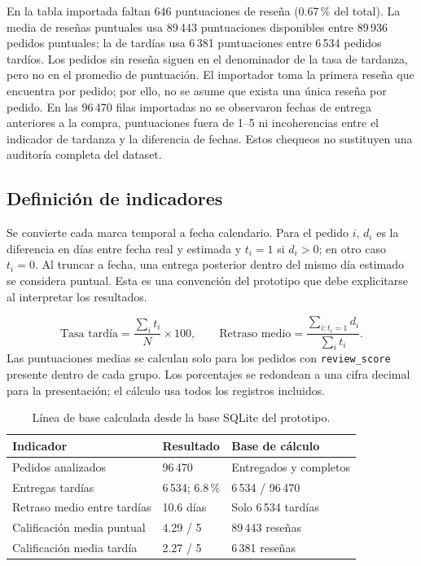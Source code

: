 \documentclass[12pt,a4paper]{article}
\begin{document}
En la tabla importada faltan 646 puntuaciones de reseña (0.67\,\% del total). La media de reseñas puntuales usa 89\,443 puntuaciones disponibles entre 89\,936 pedidos puntuales; la de tardías usa 6\,381 puntuaciones entre 6\,534 pedidos tardíos. Los pedidos sin reseña siguen en el denominador de la tasa de tardanza, pero no en el promedio de puntuación. El importador toma la primera reseña que encuentra por pedido; por ello, no se asume que exista una única reseña por pedido. En las 96\,470 filas importadas no se observaron fechas de entrega anteriores a la compra, puntuaciones fuera de 1--5 ni incoherencias entre el indicador de tardanza y la diferencia de fechas. Estos chequeos no sustituyen una auditoría completa del dataset.

\subsection{Definición de indicadores}
Se convierte cada marca temporal a fecha calendario. Para el pedido $i$, $d_i$ es la diferencia en días entre fecha real y estimada y $t_i=1$ si $d_i>0$; en otro caso $t_i=0$. Al truncar a fecha, una entrega posterior dentro del mismo día estimado se considera puntual. Esta es una convención del prototipo que debe explicitarse al interpretar los resultados.

\begin{equation}
\text{Tasa tardía}=\frac{\sum_i t_i}{N}\times100,\qquad
\text{Retraso medio}=\frac{\sum_{i:t_i=1}d_i}{\sum_i t_i}.
\end{equation}
Las puntuaciones medias se calculan solo para los pedidos con \texttt{review\_score} presente dentro de cada grupo. Los porcentajes se redondean a una cifra decimal para la presentación; el cálculo usa todos los registros incluidos.

\begin{table}[H]
\centering\small
\begin{tabularx}{\textwidth}{Y P{3.2cm} P{3.1cm}}
\toprule
Indicador & Resultado & Base de cálculo\\
\midrule
Pedidos analizados & 96\,470 & Entregados y completos\\
Entregas tardías & 6\,534; 6.8\,\% & 6\,534 / 96\,470\\
Retraso medio entre tardías & 10.6 días & Solo 6\,534 tardías\\
Calificación media puntual & 4.29 / 5 & 89\,443 reseñas\\
Calificación media tardía & 2.27 / 5 & 6\,381 reseñas\\
\bottomrule
\end{tabularx}
\caption{Línea de base calculada desde la base SQLite del prototipo.}
\end{table}
\end{document}
